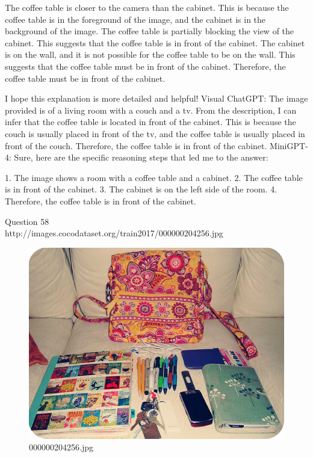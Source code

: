 \begin{enumerate}
    The coffee table is closer to the camera than the cabinet. This is because the coffee table is in the foreground of the image, and the cabinet is in the background of the image.
    The coffee table is partially blocking the view of the cabinet. This suggests that the coffee table is in front of the cabinet.
    The cabinet is on the wall, and it is not possible for the coffee table to be on the wall. This suggests that the coffee table must be in front of the cabinet.
    Therefore, the coffee table must be in front of the cabinet.
    
    I hope this explanation is more detailed and helpful! 
    \subitem Visual ChatGPT: The image provided is of a living room with a couch and a tv. From the description, I can infer that the coffee table is located in front of the cabinet. This is because the couch is usually placed in front of the tv, and the coffee table is usually placed in front of the couch. Therefore, the coffee table is in front of the cabinet.
    \subitem MiniGPT-4: Sure, here are the specific reasoning steps that led me to the answer:

    1. The image shows a room with a coffee table and a cabinet.
    2. The coffee table is in front of the cabinet.
    3. The cabinet is on the left side of the room.
    4. Therefore, the coffee table is in front of the cabinet.
\end{enumerate}
Question 58\\
http://images.cocodataset.org/train2017/000000204256.jpg
\begin{figure}[h]
    \centering
    \includegraphics[width=0.8\linewidth]{../image set/hard/000000204256.jpg}
    \caption{000000204256.jpg}
\end{figure}
